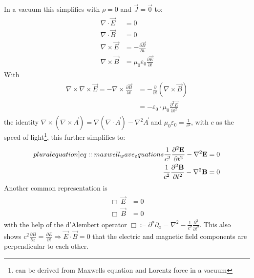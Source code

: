 % 
In a vacuum this simplifies with $\rho = 0$ and $\vec{J} = \vec{0}$ to:
% 
\begin{align}
\begin{split} \label{eq::maxwell_vacuum}
  \nabla \cdot \vec{E} &= 0 \quad\\
  \nabla \cdot \vec{B} &= 0 \quad\\
  \nabla \times \vec{E} &= -\frac{\partial\vec B}{\partial t}\\
  \nabla \times \vec{B} &= \mu_0\varepsilon_0 \frac{\partial\vec E}{\partial t}
  \end{split}
\end{align}
% 
With 
\begin{align}
\begin{split} 
    \nabla \times \nabla \times \vec{E} = - \nabla \times \frac{\partial \vec{B}} {\partial t} &= -\frac{\partial} {\partial t} \left( \nabla \times  \vec{B} \right)\\
    &= - \varepsilon_0 \cdot \mu_0 \frac{\partial^2 \vec{E}}{\partial t^2}
\end{split}
\end{align}
% 
the identity $\nabla \times \left( \nabla \times \vec{A} \right) = \nabla(\nabla \cdot \vec{A}) - \nabla^{2}\vec{A}$ and $\mu_0\varepsilon_0 = \frac{1}{c^2}$, with $c$ as the speed of light\footnote{can be derived from Maxwells equation and Lorentz force in a vacuum}, this further simplifies to:
% 
\begin{align}
\begin{split} \label[pluralequation]{eq::maxwell_wave_equations}
  \frac{1}{c^2} \frac{\partial^2 \vec{E}}{\partial t^2} - \nabla^2 \vec{E} &= 0 \\
  \frac{1}{c^2} \frac{\partial^2 \vec{B}}{\partial t^2} - \nabla^2 \vec{B} &= 0
\end{split}
\end{align}
% 
Another common representation is
% 
\begin{align}
\begin{split} \label{eq::maxwell_wave_equations_box}
  \Box \ \vec{E} &= 0 \\
  \Box \ \vec{B} &= 0
\end{split}
\end{align}
% 
with the help of the d'Alembert operator $\Box \coloneqq \partial^a\partial_a = \nabla^2 - \frac{1}{c^2} \frac{\partial^2}{\partial t^2}$.
% 
This also shows $c^2  \frac{\partial B} {\partial z} = \frac{\partial E}{\partial t} \Rightarrow \vec{E} \cdot \vec{B} = 0$ that the electric and magnetic field components are perpendicular to each other.
% 
